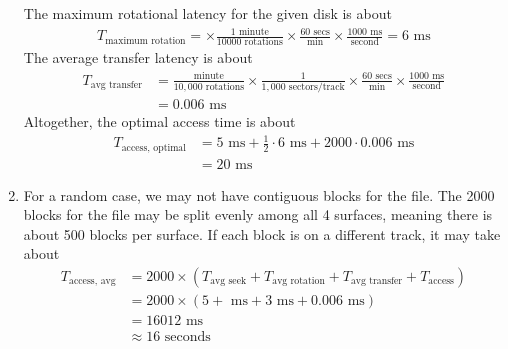 \documentclass[12pt]{article}
\newenvironment{sol}[1][Solution]{\begin{trivlist}
		\item[\hskip \labelsep {\bfseries #1:}]}{\end{trivlist}}
\begin{document}
\begin{sol}
\begin{enumerate}[label=(\alph*)]
		The maximum rotational latency for the given disk is about
		\begin{align*}
			T_{\text{maximum rotation}}
			=
			\times \frac{1 \text{ minute}}{10000 \text{ rotations}}
			\times \frac{60 \text{ secs}}{\text{min}}
			\times \frac{1000 \text{ ms}}{\text{second}}
			=6\text{ ms}
		\end{align*}
		The average transfer latency is about
		\begin{align*}
			T_{\text{avg transfer}}
			&=\frac{\text{minute}}{10,000 \text{ rotations}}
			\times \frac{1}{1,000 \text{ sectors/track}}
			\times \frac{60 \text{ secs}}{\text{min}}
			\times \frac{1000 \text{ ms}}{\text{second}}\\
			&=0.006\text{ ms}
		\end{align*}
		Altogether, the optimal access time is about
		\begin{align*}
			T_{\text{access, optimal}}
			&=5\text{ ms} + \frac{1}{2} \cdot 6 \text{ ms} + 2000\cdot 0.006\text{ ms}\\
			&=20\text{ ms}
		\end{align*}
		\item For a random case, we may not have contiguous blocks for the file. The 2000
		blocks for the file may be split evenly among all 4 surfaces, meaning there is about
		500 blocks per surface. If each block is on a different track, it may take about
		\begin{align*}
			T_{\text{access, avg}}&=
			2000\times \left( T_{\text{avg seek}} + T_{\text{avg rotation}} + T_{\text{avg
					transfer}} + T_{\text{access}}\right)\\
			&=2000\times (5 + \text{ ms} + 3 \text{ ms} + 0.006\text{ ms})\\
			&=16012\text{ ms}\\
			&\approx 16 \text{ seconds}
		\end{align*}
	\end{enumerate}
\end{sol}
\end{document}
